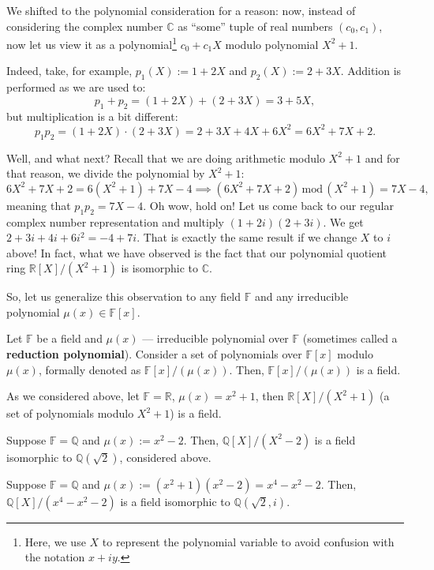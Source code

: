 \documentclass[../lecture-notes.tex]{subfiles}
\begin{document}
We shifted to the polynomial consideration for a reason: now, instead of considering the complex number $\mathbb{C}$ as ``some'' tuple of real numbers $(c_0,c_1)$, now let us view it as a polynomial\footnote{Here, we use $X$ to represent the polynomial variable to avoid confusion with the notation $x+iy$.} $c_0+c_1X$ modulo polynomial $X^2+1$. 

\begin{example}
Indeed, take, for example, $p_1(X) := 1+2X$ and $p_2(X) := 2+3X$. Addition is performed as we are used to:
\begin{equation}
    p_1 + p_2 = (1+2X) + (2+3X) = 3+5X,
\end{equation}
but multiplication is a bit different:
\begin{equation}
    p_1p_2 = (1+2X) \cdot (2+3X) = 2+3X+4X+6X^2 = 6X^2+7X+2.
\end{equation}

Well, and what next? Recall that we are doing arithmetic modulo $X^2+1$ and for that reason, we divide the polynomial by $X^2+1$:
\begin{equation}
    6X^2+7X+2 = 6(X^2+1) + 7X - 4 \implies (6X^2+7X+2) \,\text{mod}\, (X^2+1) = 7X-4,
\end{equation}
meaning that $p_1p_2 = 7X-4$. Oh wow, hold on! Let us come back to our regular complex number representation and multiply $(1+2i)(2+3i)$. We get $2+3i+4i+6i^2=-4+7i$. That is exactly the same result if we change $X$ to $i$ above! In fact, what we have observed is the fact that our polynomial quotient ring $\mathbb{R}[X]/(X^2+1)$ is isomorphic to $\mathbb{C}$.
\end{example}

So, let us generalize this observation to any field $\mathbb{F}$ and any irreducible polynomial $\mu(x) \in \mathbb{F}[x]$.

\begin{theorem}
    Let $\mathbb{F}$ be a field and $\mu(x)$ --- irreducible polynomial over $\mathbb{F}$ (sometimes called a \textbf{reduction polynomial}). Consider a set of polynomials over $\mathbb{F}[x]$ modulo $\mu(x)$, formally denoted as $\mathbb{F}[x]/(\mu(x))$. Then, $\mathbb{F}[x]/(\mu(x))$ is a field.
\end{theorem}

\begin{example}
    As we considered above, let $\mathbb{F}=\mathbb{R}$, $\mu(x)=x^2+1$, then $\mathbb{R}[X]/(X^2+1)$ (a set of polynomials modulo $X^2+1$) is a field.
\end{example}
\begin{example}
    Suppose $\mathbb{F}=\mathbb{Q}$ and $\mu(x) := x^2-2$. Then, $\mathbb{Q}[X]/(X^2-2)$ is a field isomorphic to $\mathbb{Q}(\sqrt{2})$, considered above.
\end{example}
\begin{example}
    Suppose $\mathbb{F}=\mathbb{Q}$ and $\mu(x) := (x^2+1)(x^2-2)=x^4-x^2-2$. Then, $\mathbb{Q}[X]/(x^4-x^2-2)$ is a field isomorphic to $\mathbb{Q}(\sqrt{2},i)$.
\end{example}
\end{document}
